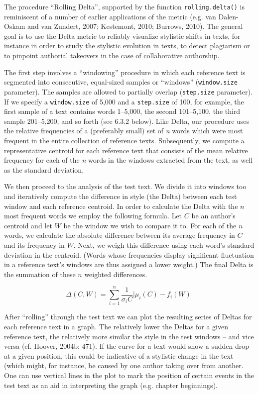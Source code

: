 \documentclass[11pt,a4paper]{article}
\def\code#1{{\tt #1}}
\begin{document}
The procedure “Rolling Delta”, supported by the function \code{rolling.delta()}
is reminiscent of a number of earlier applications of the metric (e.g.
van Dalen-Oskam and van Zundert, 2007; Kestemont, 2010; Burrows, 2010).
The general goal is to use the Delta metric to reliably visualize
stylistic shifts in texts, for instance in order to study the stylistic
evolution in texts, to detect plagiarism or to pinpoint authorial
takeovers in the case of collaborative authorship.

The first step involves a “windowing” procedure in which each reference
text is segmented into consecutive, equal-sized samples or ``windows''
(\code{window.size} parameter). The samples are allowed to partially
overlap (\code{step.size} parameter). If we specify a \code{window.size}
of 5,000 and a \code{step.size} of 100, for example, the first
sample of a text contains words 1--5,000, the second 101--5,100, the
third sample 201--5,200, and so forth (see 6.3.2 below). Like Delta,
our procedure uses the relative frequencies of a (preferably small)
set of \textit{n} words which were most frequent in the entire collection of
reference texts. Subsequently, we compute a representative centroid
for each reference text that consists of the mean relative frequency
for each of the \textit{n} words in the windows extracted from the text,
as well as the standard deviation.

We then proceed to the analysis of the test text. We divide it into
windows too and iteratively compute the difference in style (the Delta)
between each test window and each reference centroid. In order to
calculate the Delta with the $n$ most frequent words we employ the following
formula. Let $C$ be an author’s centroid and let $W$ be the window we
wish to compare it to. For each of the $n$ words, we calculate the absolute
difference between its average frequency in $C$ and its frequency in
$W$. Next, we weigh this difference using each word’s standard deviation
in the centroid. (Words whose frequencies display significant fluctuation
in a reference text’s windows are thus assigned a lower weight.) The
final Delta is the summation of these $n$ weighted differences.

\[
\Delta(C,W)=\sum_{i=1}^{n}\frac{1}{\sigma_{i}C}\vert\mu_{i}(C)-f_{i}(W)\vert
\]


After “rolling” through the test text we can plot the resulting series
of Deltas for each reference text in a graph. The relatively lower
the Deltas for a given reference text, the relatively more similar
the style in the test windows – and vice versa (cf. Hoover, 2004b:
471). If the curve for a text would show a sudden drop at a given
position, this could be indicative of a stylistic change in the text
(which might, for instance, be caused by one author taking over from
another. One can use vertical lines in the plot to mark the position
of certain events in the test text as an aid in interpreting the graph
(e.g. chapter beginnings).
\end{document}
